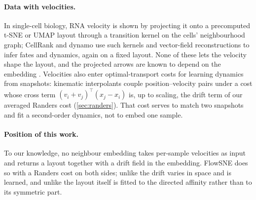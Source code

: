 \paragraph{Data with velocities.}
In single-cell biology, RNA velocity
\citep{lamanno2018rna,bergen2020generalizing} is shown by projecting it
onto a precomputed t-SNE or UMAP layout through a transition kernel on
the cells' neighbourhood graph; CellRank \citep{lange2022cellrank} and
dynamo \citep{qiu2022mapping} use such kernels and vector-field
reconstructions to infer fates and dynamics, again on a fixed layout.
None of these lets the velocity shape the layout, and the projected
arrows are known to depend on the embedding \citep{bergen2021rna}.
Velocities also enter optimal-transport costs for learning dynamics from
snapshots: kinematic interpolants \citep{jiang2026kinematic} couple
position--velocity pairs under a cost whose cross term
$(v_i+v_j)^\top(x_j-x_i)$ is, up to scaling, the drift term of our
averaged Randers cost (\cref{sec:randers}). That cost serves to match
two snapshots and fit a second-order dynamics, not to embed one sample.

\paragraph{Position of this work.}
To our knowledge, no neighbour embedding takes per-sample velocities as
input and returns a layout together with a drift field in the
embedding. FlowSNE does so with a Randers cost on both sides; unlike
\citet{dages2026harnessing} the drift varies in space and is learned, and
unlike \citet{debaussart2026finslerian} the layout itself is fitted to
the directed affinity rather than to its symmetric part.
